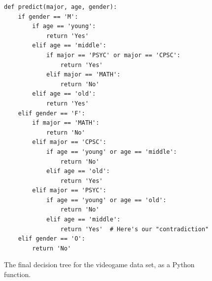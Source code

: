 \begin{figure}[ht]
\centering
\begin{Verbatim}[fontsize=\scriptsize,samepage=true,frame=single,framesep=3mm,xleftmargin=2cm,xrightmargin=2cm]
def predict(major, age, gender):
    if gender == 'M':
        if age == 'young':
            return 'Yes'
        elif age == 'middle':
            if major == 'PSYC' or major == 'CPSC':
                return 'Yes'
            elif major == 'MATH':
                return 'No'
        elif age == 'old':
            return 'Yes'
    elif gender == 'F':
        if major == 'MATH':
            return 'No'
        elif major == 'CPSC':
            if age == 'young' or age == 'middle':
                return 'No'
            elif age == 'old':
                return 'Yes'
        elif major == 'PSYC':
            if age == 'young' or age == 'old':
                return 'No'
            elif age == 'middle':
                return 'Yes'  # Here's our "contradiction"
    elif gender == 'O':
        return 'No'
\end{Verbatim}
\caption{The final decision tree for the videogame data set, as a Python
function.}
\label{fig:completeVgTreePython}
\end{figure}

